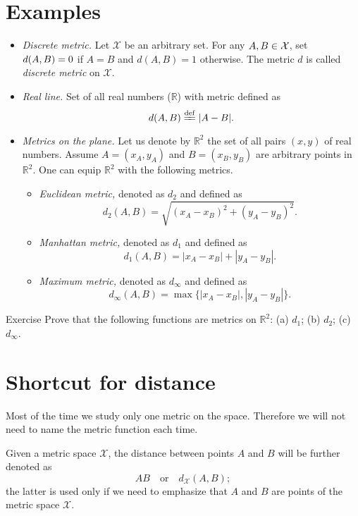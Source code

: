 \section*{Examples}

\begin{itemize}
\item {}\emph{Discrete metric.} Let $\mathcal X$ be an arbitrary set. 
For any $A,B\z\in\mathcal X$, 
set $d(A,B)\z=0$ if $A=B$ and $d(A,B)=1$ otherwise.
The metric $d$ is called \emph{discrete metric} on $\mathcal X$.
\item{}\emph{Real line.} Set of all real numbers ($\mathbb{R}$) with metric defined as 
$$d(A,B)\df|A-B|.$$
\item {}\emph{Metrics on the plane.}
Let us denote by $\mathbb{R}^2$ the set of all pairs $(x,y)$ of real numbers.
Assume $A=(x_A,y_A)$ and $B=(x_B,y_B)$ are arbitrary points in $\mathbb{R}^2$.
One can equip $\mathbb{R}^2$ with the following metrics.
\begin{itemize}
\item{}\emph{Euclidean metric,} denoted as $d_2$ and defined as \label{def:d_2}
$$d_2(A,B)=\sqrt{(x_A-x_B)^2+(y_A-y_B)^2}.$$
\item{}\emph{Manhattan metric,} denoted as $d_1$ and defined as 
$$d_1(A,B)=|x_A-x_B|+|y_A-y_B|.$$
\item{}\emph{Maximum metric,} denoted as $d_\infty$ and defined as 
$$d_\infty(A,B)=\max\{|x_A-x_B|,|y_A-y_B|\}.$$
\end{itemize}
\end{itemize}

\begin{thm}{Exercise}\label{ex:d_1+d_2+d_infty}
Prove that the following functions are metrics on $\mathbb{R}^2$:
(a) $d_1$; (b) $d_2$; (c) $d_\infty$.
\end{thm}


\section*{Shortcut for distance}

Most of the time  
we study only one metric on the space.
Therefore we will not need to name the metric function each time.

Given a metric space $\mathcal X$,
the distance between points $A$ and $B$ will be further denoted as 
$$AB
\quad
\text{or}
\quad
d_{\mathcal X}(A,B);$$
the latter is used only if we need to emphasize that $A$ and $B$ are points of the metric space $\mathcal X$.

